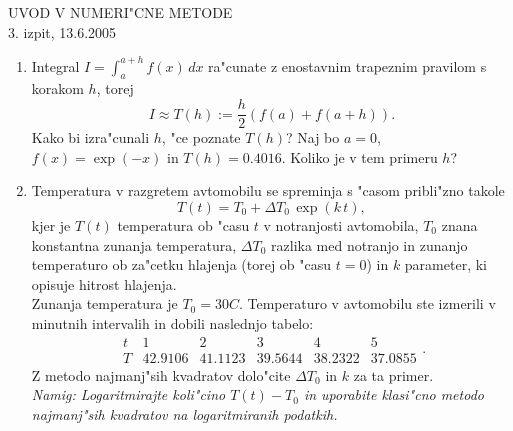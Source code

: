 

\begin{center}
  {\large UVOD V NUMERI"CNE METODE\\
    3. izpit, 13.6.2005\\
    }
\end{center}
\vspace{1cm}

\begin{enumerate}
  
  \item Integral $I=\int_{a}^{a+h} f(x)\,dx$ ra"cunate z enostavnim
      trapeznim pravilom s korakom $h$, torej
      $$ I\approx T(h):=\frac{h}{2}\left(f(a)+f(a+h)\right).$$
      Kako bi izra"cunali $h$, "ce poznate $T(h)$?
      Naj bo $a=0$, $f(x)=\exp(-x)$ in $T(h)=0.4016$. Koliko je v tem
      primeru $h$?

  \item Temperatura v razgretem avtomobilu se spreminja s 
    "casom pribli"zno takole
    $$T(t)=T_0+\Delta T_0\,\exp(k\,t),$$
    kjer je $T(t)$ temperatura ob
    "casu $t$ v notranjosti avtomobila, $T_0$ znana konstantna zunanja
    temperatura, $\Delta T_0$ razlika med notranjo in zunanjo
    temperaturo ob za"cetku hlajenja (torej ob "casu $t=0$) in $k$
    parameter, ki opisuje hitrost hlajenja.\\
    Zunanja temperatura je $T_0=30C$. Temperaturo v 
    avtomobilu ste izmerili v minutnih intervalih in dobili naslednjo
    tabelo:%
    $$
      \begin{array}{c|ccccc}
        t & 1 & 2 & 3 & 4 & 5\\ \hline
        T & 42.9106 & 41.1123 & 39.5644 & 38.2322 & 37.0855
      \end{array}.
    $$
    Z metodo najmanj"sih kvadratov dolo"cite $\Delta T_0$ in $k$ za ta primer.\\
    {\sl Namig: Logaritmirajte koli"cino $T(t)-T_0$ in uporabite klasi"cno
    metodo najmanj"sih kvadratov na logaritmiranih podatkih.}
        

\end{enumerate}
